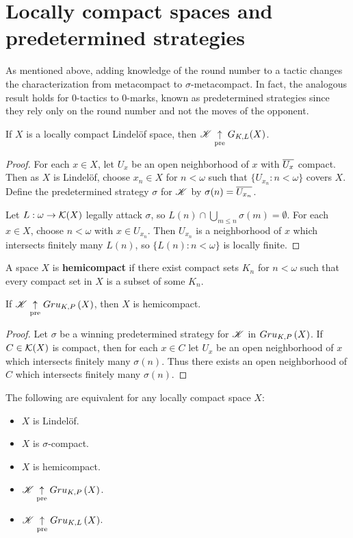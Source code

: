 \section{Locally compact spaces and predetermined strategies}

As mentioned above, adding knowledge of the round number to a tactic changes the
characterization from metacompact to $\sigma$-metacompact. In fact, the
analogous result holds
for $0$-tactics to $0$-marks, known as predetermined strategies since they
rely only on the round number and not the moves of the opponent.

\begin{thm}
  If $X$ is a locally compact Lindel\"of space, then $\mathscr{K} \underset{\text{pre}}{\uparrow} G_{K,L}(X)$.
\end{thm}

\begin{proof}
  For each $x\in X$, let $U_x$ be an open neighborhood of $x$ with $\overline{U_x}$
  compact. Then as $X$ is Lindel\"of, choose $x_n\in X$ for $n<\omega$ such that
  $\{U_{x_n}:n<\omega\}$ covers $X$. Define the predetermined strategy $\sigma$
  for $\mathscr{K}$ by $\sigma(n)=\overline{U_{x_n}}$.

  Let $L:\omega\to \mathcal{K}(X)$ legally attack $\sigma$, so
  $L(n)\cap\bigcup_{m\leq n}\sigma(m)=\emptyset$. For each $x\in X$,
  choose $n<\omega$ with $x\in U_{x_n}$. Then $U_{x_n}$ is a neighborhood of
  $x$ which intersects finitely many $L(n)$, so $\{L(n):n<\omega\}$ is
  locally finite.
\end{proof}

\begin{defn}
  A space $X$ is \textbf{hemicompact} if there exist compact sets $K_n$ for
  $n<\omega$ such that every compact set in $X$ is a subset of some $K_n$.
\end{defn}

\begin{thm}
  If $\mathscr{K}\underset{\text{pre}}{\uparrow} Gru_{K,P}\left({X}\right)$, then $X$ is hemicompact.
\end{thm}

\begin{proof}
  Let $\sigma$ be a winning predetermined strategy for $\mathscr{K}$ in
  $Gru_{K,P}\left({X}\right)$. If $C\in \mathcal{K}(X)$ is compact, then for each $x\in C$ let
  $U_x$ be an open neighborhood of $x$ which intersects finitely many
  $\sigma(n)$. Thus there exists an open neighborhood of $C$ which intersects
  finitely many $\sigma(n)$.
\end{proof}

\begin{cor}
  The following are equivalent for any locally compact space $X$:
    \begin{itemize}
      \item $X$ is Lindel\"of.
      \item $X$ is $\sigma$-compact.
      \item $X$ is hemicompact.
      \item $\mathscr{K} \underset{\text{pre}}{\uparrow} Gru_{K,P}\left({X}\right)$.
      \item $\mathscr{K} \underset{\text{pre}}{\uparrow} Gru_{K,L}\left({X}\right)$.
    \end{itemize}
\end{cor}

